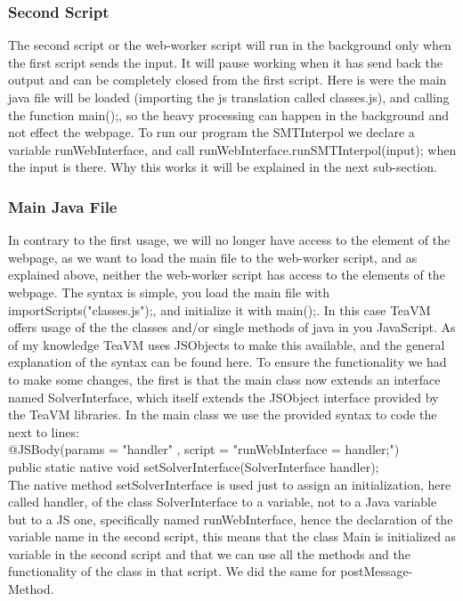 \documentclass[]{article}
\begin{document}
\subsubsection{Second Script} The second script or the web-worker script will run in the background only when the first script sends the input. It will pause working when it has send back the output and can be completely closed from the first script.
Here is were the main java file will be loaded (importing the js translation called classes.js), and calling the function main();, so the heavy processing can happen in the background and not effect the webpage. To run our program the SMTInterpol we declare a variable runWebInterface, and call runWebInterface.runSMTInterpol(input); when the input is there. Why this works it will be explained in the next sub-section.

\subsubsection{Main Java File}

In contrary to the first usage, we will no longer have access to the element of the webpage, as we want to load the main file to the web-worker script, and as explained above, neither the web-worker script has access to the elements of the webpage. The syntax is simple, you load the main file with importScripts("classes.js");, and initialize it with main();. In this case TeaVM offers usage of the the classes and/or single methods of java in you JavaScript. As of my knowledge TeaVM uses JSObjects to make this available, and the general explanation of the syntax can be found here\cite{3}. To ensure the functionality we had to make some changes, the first is that the main class now extends an interface named SolverInterface, which itself extends the JSObject interface provided by the TeaVM libraries. In the main class we use the provided syntax to code the next to lines: \\
@JSBody(params = { "handler" }, script = "runWebInterface = handler;") \\
public static native void setSolverInterface(SolverInterface handler); \\
The native method setSolverInterface is used just to assign an initialization,  here called handler, of the class SolverInterface to a variable, not to a  Java variable but to a JS one, specifically named runWebInterface, hence the declaration of the variable name in the second script, this means that the class Main is initialized as variable in the second script and that we can use all the methods and the functionality of the class in that script. We did the same for postMessage-Method.
\end{document}
